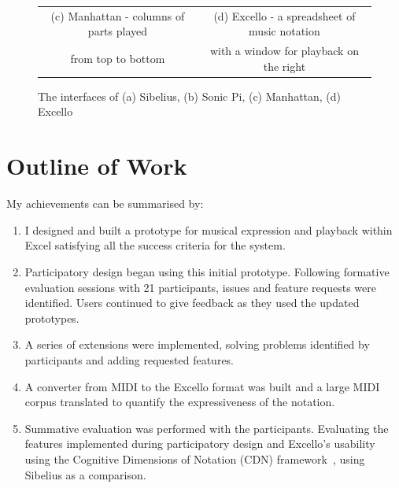 \begin{figure}[ht]
\begin{tabular}{cc}
  (c) Manhattan - columns of parts played&(d) Excello - a spreadsheet of music notation\\
  from top to bottom&with a window for playback on the right\\
\end{tabular}
\caption{The interfaces of (a) Sibelius, (b) Sonic Pi, (c) Manhattan, (d) Excello}
\label{intro:interfaces}
\end{figure}

\vspace{-10pt}

\section{Outline of Work}

My achievements can be summarised by:

\begin{enumerate}

\item I designed and built a prototype for musical expression and playback within Excel satisfying all the success criteria for the system.

\item Participatory design began using this initial prototype. Following formative evaluation sessions with 21 participants, issues and feature requests were identified. Users continued to give feedback as they used the updated prototypes.

\item A series of extensions were implemented, solving problems identified by participants and adding requested features.

\item A converter from MIDI to the Excello format was built and a large MIDI corpus translated to quantify the expressiveness of the notation.

\item Summative evaluation was performed with the participants. Evaluating the features implemented during participatory design and Excello's usability using the Cognitive Dimensions of Notation (CDN) framework~\cite{blackwell:tutorial}, using Sibelius as a comparison.

\end{enumerate}
